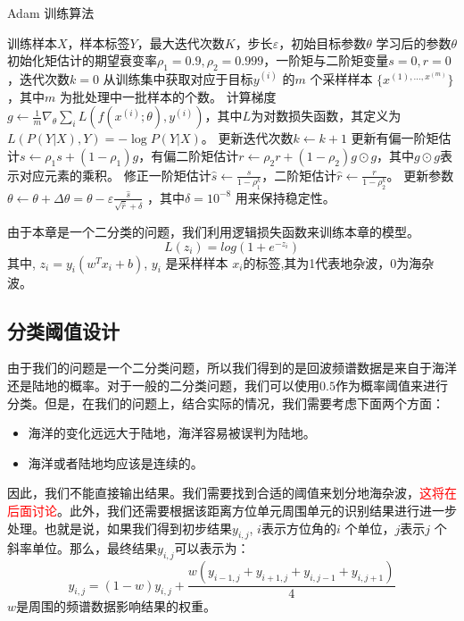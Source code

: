 \begin{algorithm}[H]
	\caption{Adam 训练算法}
	\begin{algorithmic}[1] %
		\Require 训练样本$X$，样本标签$Y$，最大迭代次数$K$，步长$\varepsilon$，初始目标参数$\theta$
		\Ensure 学习后的参数$\theta$  
		\State 初始化矩估计的期望衰变率$\rho_1=0.9,\rho_2=0.999$，一阶矩与二阶矩变量$s=0,r=0$，迭代次数$k=0$ 
			\State 从训练集中获取对应于目标$y^{(i)}$ 的$m$ 个采样样本 $\{x^{(1),\dots,x^{(m)}}\}$ ，其中$m$ 为批处理中一批样本的个数。
			\label{line:start}
			\State 计算梯度$g \leftarrow \frac{1}{m} \nabla_{\theta} \sum_i L(f(x^{(i)};\theta), y^{(i)}) $，其中$L$为对数损失函数，其定义为$L(P(Y|X),Y) = - \log P(Y|X) $。
			\State 更新迭代次数$k \leftarrow k+1 $
			\State 更新有偏一阶矩估计$s \leftarrow \rho_1 s + (1 - \rho_1) g $，有偏二阶矩估计$r \leftarrow \rho_2 r + (1-\rho_2) g \odot g $，其中$ g \odot g $表示对应元素的乘积。
			\State 修正一阶矩估计$\hat{s} \leftarrow \frac{s}{1-\rho^k_1} $，二阶矩估计$\hat{r} \leftarrow \frac{r}{1-\rho^k_2} $。
			\State 更新参数 $\theta \leftarrow \theta + \Delta \theta = \theta - \varepsilon \frac{\hat{s}}{\sqrt{\hat{r}} + \delta} $
			，其中$\delta = 10^{-8} $
			用来保持稳定性。
		\EndWhile
	\end{algorithmic}
\end{algorithm}

由于本章是一个二分类的问题，我们利用逻辑损失函数来训练本章的模型。
\begin{equation}
	L(z_i) = log(1+e^{-z_i})
\end{equation}
其中, $z_i=y_i(w^T x_i + b)$, $y_i$ 是采样样本 $x_i$的标签,其为1代表地杂波，0为海杂波。

\subsection{分类阈值设计}
由于我们的问题是一个二分类问题，所以我们得到的是回波频谱数据是来自于海洋还是陆地的概率。对于一般的二分类问题，我们可以使用$ 0.5 $作为概率阈值来进行分类。但是，在我们的问题上，结合实际的情况，我们需要考虑下面两个方面：
\begin{itemize}
	\item 海洋的变化远远大于陆地，海洋容易被误判为陆地。
	\item 海洋或者陆地均应该是连续的。
\end{itemize}
因此，我们不能直接输出结果。我们需要找到合适的阈值来划分地海杂波，\textcolor{red}{这将在后面讨论}。此外，我们还需要根据该距离方位单元周围单元的识别结果进行进一步处理。也就是说，如果我们得到初步结果$y_{i, j}$, $i$表示方位角的$ i $ 个单位，$ j $表示$ j $ 个斜率单位。那么，最终结果$y_{i, j}$可以表示为：
\begin{equation}
y_{i, j} = (1 - w)  y_{i, j} + \frac{w  (y_{i - 1, j} + y_{i + 1, j} + y_{i, j - 1} + y_{i, j + 1})}{4}
\end{equation}
$ w $是周围的频谱数据影响结果的权重。


